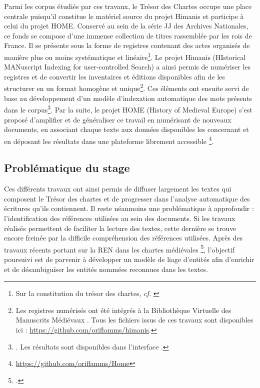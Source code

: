\documentclass[a4paper,12pt,twoside]{book}
\begin{document}
	Parmi les corpus étudiés par ces travaux, le Trésor des Chartes occupe une place centrale puisqu'il constitue le matériel source du projet Himanis et participe à celui du projet HOME. Conservé au sein de la série JJ des Archives Nationales, ce fonds se compose d'une immense collection de titres rassemblée par les rois de France. Il se présente sous la forme de registres contenant des actes organisés de manière plus ou moins systématique et linéaire\footnote{Sur la constitution du trésor des chartes, \textit{cf.} \cite{potin_mise_2007}}. Le projet Himanis (HIstorical MANuscript Indexing for user-controlled Search) a ainsi permis de numériser les registres et de convertir les inventaires et éditions disponibles afin de les structurer en un format homogène et unique\footnote{Les registres numérisés ont été intégrés à la Bibliothèque Virtuelle des Manuscrits Médiévaux \cite{noauthor_bvmm_nodate}. Tous les fichiers issus de ces travaux sont disponibles ici : \url{https://github.com/oriflamms/himanis}.}. Ces éléments ont ensuite servi de base au développement d'un modèle d'indexation automatique des mots présents dans le corpus\footnote{\cites{stutzmann_recherche_2017}. Les résultats sont disponibles dans l'interface \cite{noauthor_himanis_nodate}.}. Par la suite, le projet HOME (History of Medieval Europe) s'est proposé d'amplifier et de généraliser ce travail en numérisant de nouveaux documents, en associant chaque texte aux données disponibles les concernant et en déposant les résultats dans une plateforme librement accessible \footnote{\url{https://github.com/oriflamms/Home}}.
	
	\subsection*{Problématique du stage}
	
	Ces différents travaux ont ainsi permis de diffuser largement les textes qui composent le Trésor des chartes et de progresser dans l'analyse automatique des écritures qu'ils contiennent. Il reste néanmoins une problématique à approfondir : l'identification des références utilisées au sein des documents. Si les travaux réalisés permettent de faciliter la lecture des textes, cette dernière se trouve encore freinée par la difficile compréhension des références utilisées. Après des travaux récents portant sur la REN dans les chartes médiévales \footcite{torres_aguilar_named_2021}, l'objectif poursuivi est de parvenir à développer un modèle de liage d'entités afin d'enrichir et de désambiguïser les entités nommées reconnues dans les textes. 
	
\end{document}
